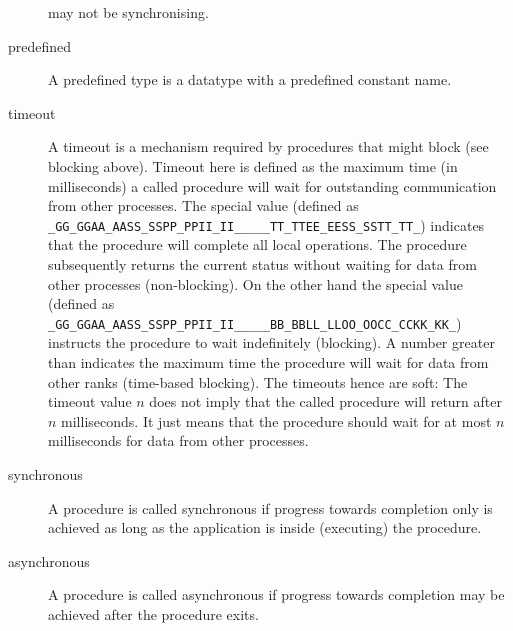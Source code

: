 \documentclass[a4paper]{article}
\makeatletter
\newlength{\st}\setlength{\st}{0pt}
\newcommand{\zerowsep}{\hskip 0pt plus 0.1pt minus 0.1pt}
\newcommand{\ZSEP}[1]{\ifx#1\@@@EOZ@@@\let\next\relax\else\ifx#1\_#1\zerowsep\else#1\fi\let\next\ZSEP\fi\next}
\newcommand{\zsep}[1]{\ZSEP{}#1\@@@EOZ@@@}
\newcommand{\GASPITEST}{{\tt\protect\zsep{GASPI\_TEST}}}
\newcommand{\GASPIBLOCK}{{\tt\protect\zsep{GASPI\_BLOCK}}}
\makeatother
\begin{document}
\begin{description}
  may not be synchronising.
\item[predefined] A predefined type is a datatype with a predefined
  constant name.
\item[timeout]  A timeout is a mechanism required by procedures that
  might block (see blocking above). Timeout here is defined as the maximum
  time (in milliseconds) a called procedure will wait for outstanding communication
  from other processes. The special value   (defined as \GASPITEST{}) indicates
  that the procedure will complete all local operations. The procedure subsequently returns
  the current status without waiting for data from other processes (non-blocking). On the other hand the
  special value  (defined as \GASPIBLOCK{}) instructs the procedure to wait indefinitely (blocking).
  A number greater than  indicates the maximum time the procedure will wait for
  data from other ranks (time-based blocking).  The timeouts hence are soft: The timeout value $n$ does
  not imply that the called procedure will return after $n$  milliseconds. It just means that the procedure should wait for at
  most $n$ milliseconds for data from other processes.
\item[synchronous]
  A procedure is called synchronous if progress towards
  completion only is achieved as long as  the application is inside (executing) the procedure.
\begin{center}
\end{center}
\item[asynchronous]
  A procedure is called asynchronous if progress towards
  completion may be achieved after the procedure exits.
\begin{center}
\end{center}

\end{description}
\end{document}

